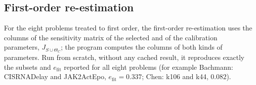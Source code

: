\subsection*{First-order re-estimation}
For the eight problems treated to first order, the first-order re-estimation uses the columns of the sensitivity matrix of the selected and of the calibration parameters, $J_{S\cup\Theta_C}$; the program computes the columns of both kinds of parameters. Run from scratch, without any cached result, it reproduces exactly the subsets and $e_{\mathrm{fit}}$ reported for all eight problems (for example Bachmann: CISRNADelay and JAK2ActEpo, $e_{\mathrm{fit}}=0.337$; Chen: k106 and k44, $0.082$).
